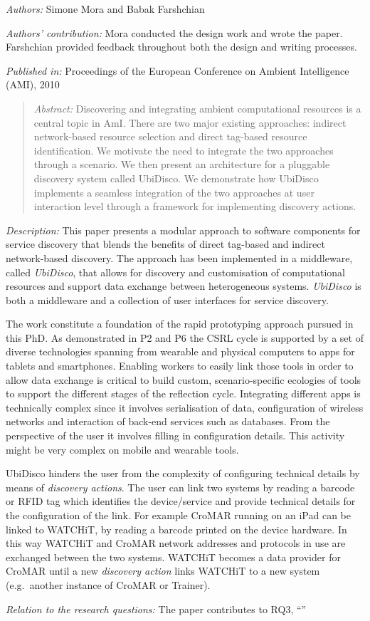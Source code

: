 \emph{Authors:} Simone Mora and Babak Farshchian

\emph{Authors' contribution:} Mora conducted the design work and wrote the paper. Farshchian provided feedback throughout both the design and writing processes.

\emph{Published in:} Proceedings of the European Conference on Ambient Intelligence (AMI), 2010 
\begin{quote}
	\emph{Abstract:} Discovering and integrating ambient computational resources is a central topic in AmI. There are two major existing approaches: indirect network-based resource selection and direct tag-based resource identification. We motivate the need to integrate the two approaches through a scenario. We then present an architecture for a pluggable discovery system called UbiDisco. We demonstrate how UbiDisco implements a seamless integration of the two approaches at user interaction level through a framework for implementing discovery actions. 
\end{quote}

\emph{Description:} This paper presents a modular approach to software components for service discovery that blends the benefits of direct tag-based and indirect network-based discovery. The approach has been implemented in a middleware, called \emph{UbiDisco}, that allows for discovery and customisation of computational resources and support data exchange between heterogeneous systems. \emph{UbiDisco} is both a middleware and a collection of user interfaces for service discovery.

The work constitute a foundation of the rapid prototyping approach pursued in this PhD. As demonstrated in P2 and P6 the CSRL cycle is supported by a set of diverse technologies spanning from wearable and physical computers to apps for tablets and smartphones. Enabling workers to easily link those tools in order to allow data exchange is critical to build custom, scenario-specific ecologies of tools to support the different stages of the reflection cycle. Integrating different apps is technically complex since it involves serialisation of data, configuration of wireless networks and interaction of back-end services such as databases. From the perspective of the user it involves filling in configuration details. This activity might be very complex on mobile and wearable tools.

UbiDisco hinders the user from the complexity of configuring technical details by means of \emph{discovery actions}. The user can link two systems by reading a barcode or RFID tag which identifies the device/service and provide technical details for the configuration of the link. For example CroMAR running on an iPad can be linked to WATCHiT, by reading a barcode printed on the device hardware. In this way WATCHiT and CroMAR network addresses and protocols in use are exchanged between the two systems. WATCHiT becomes a data provider for CroMAR until a new \emph{discovery action} links WATCHiT to a new system (e.g.~another instance of CroMAR or Trainer).

\emph{Relation to the research questions: } The paper contributes to RQ3, ``\RQiii'' 
